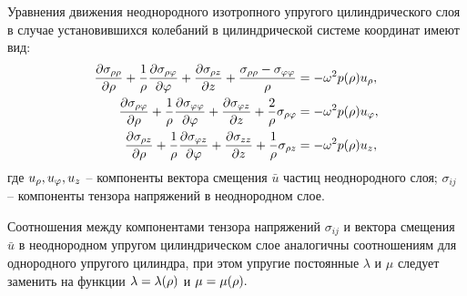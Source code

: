 Уравнения движения неоднородного изотропного упругого цилиндрического слоя в случае установившихся колебаний в цилиндрической системе координат имеют вид:
\begin{equation}\label{equation_dvij_splosh_sred}
\begin{aligned}
\frac{\partial\sigma_{\rho\rho}}{
\partial \rho}+\frac{1}{\rho}\frac{\partial\sigma_{\rho\varphi}}{\partial\varphi}+\frac{\partial\sigma_{\rho z}}{\partial z}+\frac{\sigma_{\rho\rho}-\sigma_{\varphi\varphi}}{\rho}&=-\omega^2 p(\rho)u_{\rho},\\
\frac{\partial\sigma_{\rho\varphi}}{
\partial \rho}+\frac{1}{\rho}\frac{\partial\sigma_{\varphi\varphi}}{\partial\varphi}+\frac{\partial\sigma_{\varphi z}}{\partial z}+\frac{2}{\rho}\sigma_{\rho\varphi}&=-\omega^2 p(\rho)u_{\varphi},\\
\frac{\partial\sigma_{\rho z}}{
\partial \rho}+\frac{1}{\rho}\frac{\partial\sigma_{\varphi z}}{\partial\varphi}+\frac{\partial\sigma_{zz}}{\partial z}+\frac{1}{\rho}\sigma_{\rho z}&=-\omega^2 p(\rho)u_z,
\end{aligned}
\end{equation}
где $u_{\rho}, u_{\varphi}, u_z$ -- компоненты вектора смещения $\bar{u}$ частиц неоднородного слоя; $\sigma_{ij}$ -- компоненты тензора напряжений в неоднородном слое.

Соотношения между компонентами тензора напряжений $\sigma_{ij}$ и вектора смещения $\bar{u}$ в неоднородном упругом цилиндрическом слое аналогичны соотношениям для однородного упругого цилиндра, при этом упругие постоянные $\lambda$ и $\mu$ следует заменить на функции $\lambda=\lambda(\rho)$ и $\mu=\mu(\rho).$

